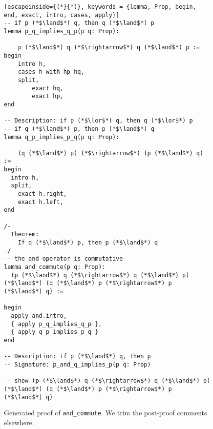 \begin{figure*}[h]
\label{leancommute}
\begin{lstlisting}[escapeinside={(*}{*)}, keywords = {lemma, Prop, begin, end, exact, intro, cases, apply}]
-- if p (*$\land$*) q, then q (*$\land$*) p
lemma p_q_implies_q_p(p q: Prop):

    p (*$\land$*) q (*$\rightarrow$*) q (*$\land$*) p :=
begin
    intro h,
    cases h with hp hq,
    split,
        exact hq,
        exact hp,
end

-- Description: if p (*$\lor$*) q, then q (*$\lor$*) p
-- if q (*$\land$*) p, then p (*$\land$*) q
lemma q_p_implies_p_q(p q: Prop):

    (q (*$\land$*) p) (*$\rightarrow$*) (p (*$\land$*) q) :=
begin
  intro h,
  split,
    exact h.right,
    exact h.left,
end

/-
  Theorem:
    If q (*$\land$*) p, then p (*$\land$*) q
-/
-- the and operator is commutative
lemma and_commute(p q: Prop):
  (p (*$\land$*) q (*$\rightarrow$*) q (*$\land$*) p) (*$\land$*) (q (*$\land$*) p (*$\rightarrow$*) p (*$\land$*) q) :=

begin
  apply and.intro,
  { apply p_q_implies_q_p },
  { apply q_p_implies_p_q }
end

-- Description: if p (*$\land$*) q, then p
-- Signature: p_and_q_implies_p(p q: Prop)

-- show (p (*$\land$*) q (*$\rightarrow$*) q (*$\land$*) p) (*$\land$*) (q (*$\land$*) p (*$\rightarrow$*) p (*$\land$*) q)
\end{lstlisting}
\caption{Generated proof of \lstinline{and_commute}. We trim the post-proof comments elsewhere.}
\end{figure*}



